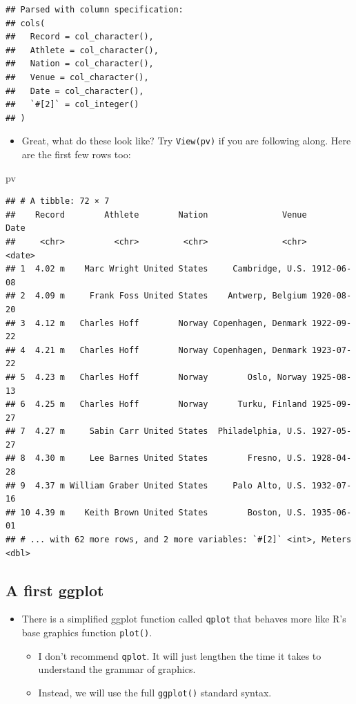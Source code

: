 \documentclass[]{book}
\newenvironment{Shaded}{\begin{snugshade}}{\end{snugshade}}
\newcommand{\NormalTok}[1]{{#1}}
\providecommand{\tightlist}{%
  \setlength{\itemsep}{0pt}\setlength{\parskip}{0pt}}
\theoremstyle{definition}
\theoremstyle{definition}
\theoremstyle{remark}
\begin{document}
\begin{verbatim}
## Parsed with column specification:
## cols(
##   Record = col_character(),
##   Athlete = col_character(),
##   Nation = col_character(),
##   Venue = col_character(),
##   Date = col_character(),
##   `#[2]` = col_integer()
## )
\end{verbatim}

\begin{itemize}
\tightlist
\item
  Great, what do these look like? Try \texttt{View(pv)} if you are
  following along. Here are the first few rows too:
\end{itemize}

\begin{Shaded}
\begin{Highlighting}[]
\NormalTok{pv}
\end{Highlighting}
\end{Shaded}

\begin{verbatim}
## # A tibble: 72 × 7
##    Record        Athlete        Nation               Venue       Date
##     <chr>          <chr>         <chr>               <chr>     <date>
## 1  4.02 m    Marc Wright United States     Cambridge, U.S. 1912-06-08
## 2  4.09 m     Frank Foss United States    Antwerp, Belgium 1920-08-20
## 3  4.12 m   Charles Hoff        Norway Copenhagen, Denmark 1922-09-22
## 4  4.21 m   Charles Hoff        Norway Copenhagen, Denmark 1923-07-22
## 5  4.23 m   Charles Hoff        Norway        Oslo, Norway 1925-08-13
## 6  4.25 m   Charles Hoff        Norway      Turku, Finland 1925-09-27
## 7  4.27 m     Sabin Carr United States  Philadelphia, U.S. 1927-05-27
## 8  4.30 m     Lee Barnes United States        Fresno, U.S. 1928-04-28
## 9  4.37 m William Graber United States     Palo Alto, U.S. 1932-07-16
## 10 4.39 m    Keith Brown United States        Boston, U.S. 1935-06-01
## # ... with 62 more rows, and 2 more variables: `#[2]` <int>, Meters <dbl>
\end{verbatim}

\subsection{A first ggplot}\label{a-first-ggplot}

\begin{itemize}
\tightlist
\item
  There is a simplified ggplot function called \texttt{qplot} that
  behaves more like R's base graphics function \texttt{plot()}.

  \begin{itemize}
  \tightlist
  \item
    I don't recommend \texttt{qplot}. It will just lengthen the time it
    takes to understand the grammar of graphics.
  \item
    Instead, we will use the full \texttt{ggplot()} standard syntax.
  \end{itemize}
\end{itemize}
\end{document}
